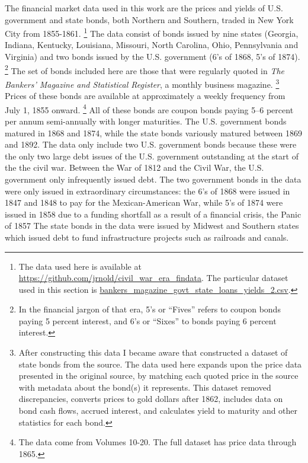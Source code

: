 The financial market data used in this work are the prices and yields of U.S. government and state bonds, both Northern and Southern, traded in New York City from 1855-1861.%
\footnote{
  The data used here is available at \url{https://github.com/jrnold/civil_war_era_findata}.
  The particular dataset used in this section is \href{https://github.com/jrnold/civil_war_era_findata/blob/master/data/bankers_magazine_govt_state_loans_yields_2.csv}{bankers\_magazine\_govt\_state\_loans\_yields\_2.csv}.
}
The data consist of bonds issued by nine states (Georgia, Indiana, Kentucky, Louisiana, Missouri, North Carolina, Ohio, Pennsylvania and Virginia) and two bonds issued by the U.S. government (6's of 1868, 5's of 1874).%
\footnote{In the financial jargon of that era, 5's or ``Fives'' refers to coupon bonds paying 5 percent interest, and 6's or ``Sixes'' to bonds paying 6 percent interest.}
The set of bonds included here are those that were regularly quoted in \textit{The Bankers' Magazine and Statistical Register}, a monthly business magazine.
\footnote{After constructing this data I became aware that \textcite{DwyerHaferWeber1999} constructed a dataset of state bonds from the source.
  The data used here expands upon the price data presented in the original source, by matching each quoted price in the source with metadata about the bond(s) it represents.
  This dataset removed discrepancies, converts prices to gold dollars after 1862, includes data on bond cash flows, accrued interest, and calculates yield to maturity and other statistics for each bond.
}
Prices of these bonds are available at approximately a weekly frequency from July  1, 1855 onward.
\footnote{The data come from Volumes 10-20. The full dataset has price data through 1865.}
All of these bonds are coupon bonds paying 5--6 percent per annum semi-annually with longer maturities.
The U.S. government bonds matured in 1868 and 1874, while the state bonds variously matured between 1869 and 1892.%
The data only include two U.S. government bonds because these were the only two large debt issues of the U.S. government outstanding at the start of the the civil war.%
Between the War of 1812 and the Civil War, the U.S. government only infrequently issued debt.
The two government bonds  in the data were only issued in extraordinary circumstances: the 6's of 1868 were issued in 1847 and 1848 to pay for the Mexican-American War, while 5's of 1874 were issued in 1858 due to a funding shortfall as a result of a financial crisis, the Panic of 1857  \parencites[297-302]{HomerSylla2005}[72-73,76]{DeKnight1900}
The state bonds in the data were issued by Midwest and Southern states which issued debt to fund infrastructure projects such as railroads and canals.

